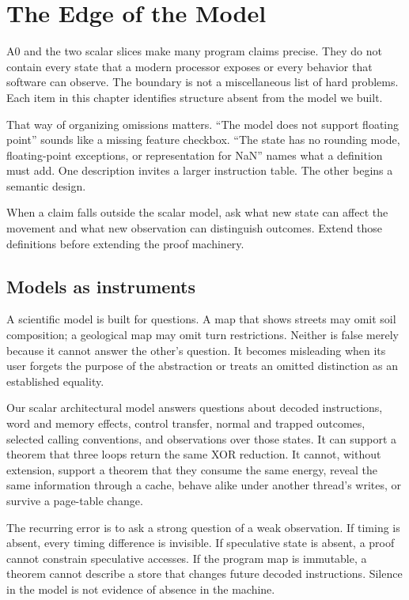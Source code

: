 \chapter{The Edge of the Model}
\label{ch:model-boundary}

A0 and the two scalar slices make many program claims precise. They do not
contain every state that a modern processor exposes or every behavior that
software can observe. The boundary is not a miscellaneous list of hard
problems. Each item in this chapter identifies structure absent from the model
we built.

That way of organizing omissions matters. ``The model does not support
floating point'' sounds like a missing feature checkbox. ``The state has no
rounding mode, floating-point exceptions, or representation for NaN'' names
what a definition must add. One description invites a larger instruction
table. The other begins a semantic design.

\begin{keyidea}[title={Every boundary names missing state or missing observation}]
When a claim falls outside the scalar model, ask what new state can affect the
movement and what new observation can distinguish outcomes. Extend those
definitions before extending the proof machinery.
\end{keyidea}

\section{Models as instruments}

A scientific model is built for questions. A map that shows streets may omit
soil composition; a geological map may omit turn restrictions. Neither is
false merely because it cannot answer the other's question. It becomes
misleading when its user forgets the purpose of the abstraction or treats an
omitted distinction as an established equality.

Our scalar architectural model answers questions about decoded instructions,
word and memory effects, control transfer, normal and trapped outcomes,
selected calling conventions, and observations over those states. It can
support a theorem that three loops return the same XOR reduction. It cannot,
without extension, support a theorem that they consume the same energy, reveal
the same information through a cache, behave alike under another thread's
writes, or survive a page-table change.

The recurring error is to ask a strong question of a weak observation. If
timing is absent, every timing difference is invisible. If speculative state
is absent, a proof cannot constrain speculative accesses. If the program map
is immutable, a theorem cannot describe a store that changes future decoded
instructions. Silence in the model is not evidence of absence in the machine.

